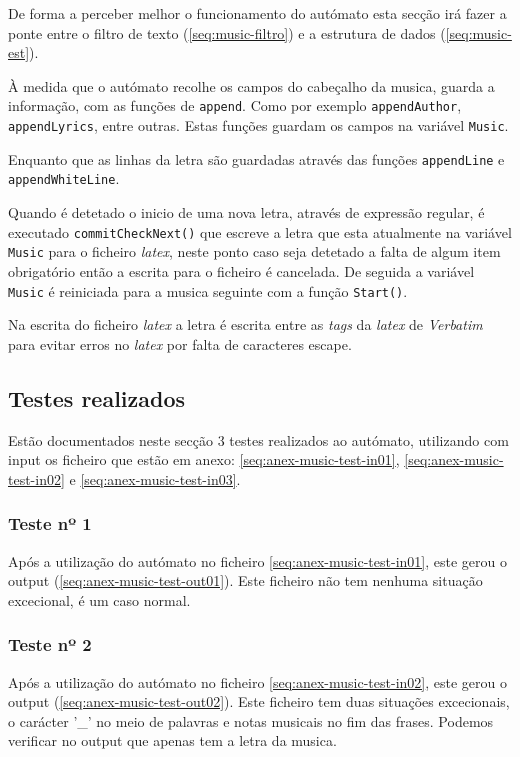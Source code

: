 De forma a perceber melhor o funcionamento do autómato esta secção irá fazer a ponte entre o filtro de texto (\ref{seq:music-filtro}) e a estrutura de dados (\ref{seq:music-est}).

À medida que o autómato recolhe os campos do cabeçalho da musica, guarda a informação, com as funções de \verb!append!. Como por exemplo \verb!appendAuthor!, \verb!appendLyrics!, entre outras. Estas funções guardam os campos na variável \verb!Music!.

Enquanto que as linhas da letra são guardadas através das funções \verb!appendLine! e \verb!appendWhiteLine!.

Quando é detetado o inicio de uma nova letra, através de expressão regular, é executado \verb!commitCheckNext()! que escreve a letra que esta atualmente na variável \verb!Music! para o ficheiro \emph{latex}, neste ponto caso seja detetado a falta de algum item obrigatório então a escrita para o ficheiro é cancelada.
De seguida a variável \verb!Music! é reiniciada para a musica seguinte com a função \verb!Start()!.

Na escrita do ficheiro \emph{latex} a letra é escrita entre as \emph{tags} da \emph{latex} de \emph{Verbatim} para evitar erros no \emph{latex} por falta de caracteres escape.

\subsection{Testes realizados}
\label{seq:music-test}
Estão documentados neste secção 3 testes realizados ao autómato, utilizando com input os ficheiro que estão em anexo: \ref{seq:anex-music-test-in01}, \ref{seq:anex-music-test-in02} e \ref{seq:anex-music-test-in03}.

\subsubsection{Teste nº 1}

Após a utilização do autómato no ficheiro \ref{seq:anex-music-test-in01}, este gerou o output (\ref{seq:anex-music-test-out01}).
Este ficheiro não tem nenhuma situação excecional, é um caso normal.

\subsubsection{Teste nº 2}

Após a utilização do autómato no ficheiro \ref{seq:anex-music-test-in02}, este gerou o output (\ref{seq:anex-music-test-out02}).
Este ficheiro tem duas situações excecionais, o carácter '\_' no meio de palavras e notas musicais no fim das frases.
Podemos verificar no output que apenas tem a letra da musica.

